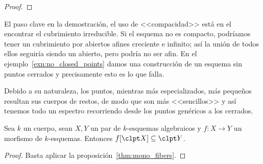 \begin{proof}
\end{proof}
El paso clave en la demostración, el uso de <<compacidad>> está en el encontrar el cubrimiento irreducible.
Si el esquema no es compacto, podríamos tener un cubrimiento por abiertos afines creciente e infinito; así la unión de todos ellos seguiría siendo un abierto,
pero podría no ser afin.
En el ejemplo~\ref{exn:no_closed_points} damos una construcción de un esquema sin puntos cerrados y precisamente esto es lo que falla.

Debido a su naturaleza, los puntos, mientras más especializados, más pequeños resultan sus cuerpos de restos, de modo que son más <<sencillos>>
y así tenemos todo un espectro recorriendo desde los puntos genéricos a los cerrados.
\begin{prop}
	Sea $k$ un cuerpo, sean $X, Y$ un par de $k$-esquemas algebraicos y $f \colon X \to Y$ un morfismo de $k$-esquemas.
	Entonces $f[\clpt X] \subseteq \clpt Y$.
\end{prop}
\begin{proof}
	Basta aplicar la proposición~\ref{thm:mono_fibers}.
\end{proof}

